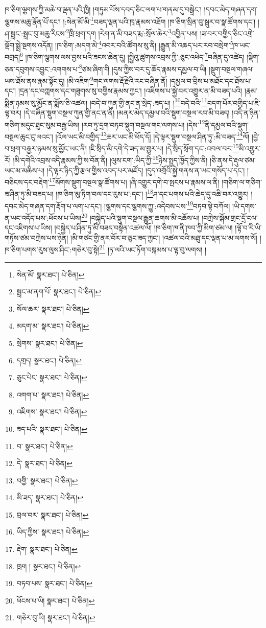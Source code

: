 ཁ་ཅིག་ལྕགས་ཀྱི་མཆེ་བ་ལྡན་པའི་ཁྱི། །གཏུམ་པོས་དབད་ཅིང་ལག་པ་གནམ་དུ་བསྒྲེང་། །དབང་མེད་གཞན་དག་ལྕགས་མཆུ་རྣོན་པོ་དང་། །:སེན་མོ་མི་\footnote{སེན་མོ་  སྣར་ཐང་།  པེ་ཅིན། }བཟད་ལྡན་པའི་ཁྭ་རྣམས་འཐོག །ཁ་ཅིག་སྲིན་བུ་སྦུར་བ་སྣ་ཚོགས་དང་། །ཤ་སྦྲང་:སྦྲང་བུ་མཆུ་རིངས་\footnote{སྦྲང་མ་ནག་པོ་  སྣར་ཐང་།  པེ་ཅིན། }ཁྲི་ཕྲག་དག །རེག་ན་མི་བཟད་རྨ་:སྲོལ་ཆེར་\footnote{སོལ་ཆར་  སྣར་ཐང་།  པེ་ཅིན། }འབྱིན་པས། །ཟ་བར་བགྱིད་ཅིང་འགྲེ་ལྡོག་སྨྲེ་སྔགས་འདོན། །ཁ་ཅིག་:མདག་མེ་\footnote{མདག་མ་  སྣར་ཐང་།  པེ་ཅིན། }འབར་བའི་ཚོགས་སུ་ནི། །རྒྱུན་མི་འཆད་པར་རབ་བསྲེག་\footnote{སྲེགས་  སྣར་ཐང་།  པེ་ཅིན། }ཁ་ཡང་བགྲད།\footnote{དགྲད།  སྣར་ཐང་།  པེ་ཅིན། } །ཁ་ཅིག་ལྕགས་ལས་བྱས་པའི་ཟངས་ཆེན་དུ། །སྤྱིའུ་ཚུགས་འབྲས་ཀྱི་:ཅུང་འཕེད་\footnote{ཅུང་པེང་  སྣར་ཐང་།  པེ་ཅིན། }བཞིན་དུ་འཚེད། །སྡིག་ཅན་དབུགས་འབྱུང་:འགགས་པ་\footnote{འགག་པ་  སྣར་ཐང་།  པེ་ཅིན། }ཙམ་ཞིག་གི །དུས་ཀྱིས་བར་དུ་ཆོད་རྣམས་དམྱལ་བ་ཡི། །སྡུག་བསྔལ་གཞལ་ཡས་ཐོས་ནས་རྣམ་སྟོང་དུ། །མི་འཇིག་\footnote{འཇིགས་  སྣར་ཐང་།  པེ་ཅིན། }གང་ལགས་རྡོ་རྗེའི་རང་བཞིན་ནོ། །དམྱལ་བ་བྲིས་པ་མཐོང་དང་ཐོས་པ་དང་། །དྲན་དང་བཀླགས་དང་གཟུགས་སུ་བགྱིས་རྣམས་ཀྱང་། །འཇིགས་པ་སྐྱེ་བར་འགྱུར་ན་མི་བཟད་པའི། །རྣམ་སྨིན་ཉམས་སུ་མྱོང་ན་སྨོས་ཅི་འཚལ། །བདེ་བ་ཀུན་གྱི་ནང་ན་སྲེད་:ཟད་པ། །\footnote{ཟད་པའི་  སྣར་ཐང་།  པེ་ཅིན། }བདེ་བའི་\footnote{བ་  སྣར་ཐང་།  པེ་ཅིན། }བདག་པོར་བགྱིད་པ་ཇི་ལྟ་བར། །དེ་བཞིན་སྡུག་བསྔལ་ཀུན་གྱི་ནང་ན་ནི། །མནར་མེད་དམྱལ་བའི་སྡུག་བསྔལ་རབ་མི་བཟད། །འདི་ན་ཉིན་གཅིག་མདུང་ཐུང་སུམ་བརྒྱ་ཡིས། །རབ་ཏུ་དྲག་བཏབ་སྡུག་བསྔལ་གང་ལགས་པ། །དེས་\footnote{དེ་  སྣར་ཐང་།  པེ་ཅིན། }ནི་དམྱལ་བའི་སྡུག་བསྔལ་ཆུང་ངུ་ལའང་། །འོལ་ཡང་མི་བགྱིད་\footnote{བགྱི་  སྣར་ཐང་།  པེ་ཅིན། }ཆར་ཡང་མི་ཕོད་དོ། །དེ་ལྟར་སྡུག་བསྔལ་ཤིན་ཏུ་:མི་བཟད་\footnote{མི་ཟད་  སྣར་ཐང་།  པེ་ཅིན། }ལོ། །བྱེ་བ་ཕྲག་བརྒྱར་ཉམས་སུ་མྱོང་ཡང་ནི། །ཇི་སྲིད་མི་དགེ་དེ་ཟད་མ་གྱུར་པ། །དེ་སྲིད་སྲོག་དང་:འབལ་བར་\footnote{བྲལ་བར་  སྣར་ཐང་།  པེ་ཅིན། }མི་འགྱུར་རོ། །མི་དགེའི་འབྲས་འདི་རྣམས་ཀྱི་ས་བོན་ནི། །ལུས་ངག་:ཡིད་ཀྱི་\footnote{ཡིད་ཀྱིས་  སྣར་ཐང་།  པེ་ཅིན། }ཉེས་སྤྱད་ཁྱོད་ཀྱིས་ནི། །ཅི་ནས་དེ་རྡུལ་ཙམ་ཡང་མ་མཆིས་པ། །དེ་ལྟར་ཉིད་ཀྱི་རྩལ་གྱིས་འབད་པར་མཛོད། །དུད་འགྲོའི་སྐྱེ་གནས་ན་ཡང་གསོད་པ་དང་། །བཅིངས་དང་བརྡེག་\footnote{རྡེག་  སྣར་ཐང་།  པེ་ཅིན། }སོགས་སྡུག་བསྔལ་སྣ་ཚོགས་པ། །ཞི་འགྱུར་དགེ་བ་སྤངས་པ་རྣམས་ལ་ནི། །གཅིག་ལ་གཅིག་ཟ་ཤིན་ཏུ་མི་བཟད་པ། །ཁ་ཅིག་མུ་ཏིག་བལ་དང་རུས་པ་:དང་། །\footnote{ཁྲག །  སྣར་ཐང་།  པེ་ཅིན། }ཤ་དང་པགས་པའི་ཆེད་དུ་འཆི་བར་འགྱུར། །དབང་མེད་གཞན་དག་རྡོག་པ་ལག་པ་དང་། །ལྕགས་དང་ལྕགས་ཀྱུ་:འདེབས་པས་\footnote{བཏབ་པས་  སྣར་ཐང་།  པེ་ཅིན། }བཏབ་སྟེ་བཀོལ། །ཡི་དགས་ན་ཡང་འདོད་པས་:ཕོངས་པ་ཡིས།\footnote{ཕོངས་པ་ཡི།  སྣར་ཐང་།  པེ་ཅིན། } །བསྐྱེད་པའི་སྡུག་བསྔལ་རྒྱུན་ཆགས་མི་འཆོས་པ། །བཀྲེས་སྐོམ་གྲང་དྲོ་ངལ་དང་འཇིགས་པ་ཡིས། །བསྐྱེད་པ་ཤིན་ཏུ་མི་བཟད་བསྟེན་འཚལ་ལོ། །ཁ་ཅིག་ཁ་ནི་ཁབ་ཀྱི་མིག་ཙམ་ལ། །ལྟོ་བ་རི་ཡི་གཏོས་ཙམ་བཀྲེས་པས་ཉེན། །མི་གཙང་གྱི་ནར་བོར་བ་ཅུང་ཟད་ཀྱང་། །འཚལ་བའི་མཐུ་དང་ལྡན་པ་མ་ལགས་སོ། །ཁ་ཅིག་པགས་རུས་ལུས་ཤིང་:གཅེར་བུ་སྟེ།\footnote{གཅེར་བུ་ཡི།  སྣར་ཐང་།  པེ་ཅིན། } །ཏ་ལའི་ཡང་ཏོག་བསྐམས་པ་ལྟ་བུ་ལགས། །
